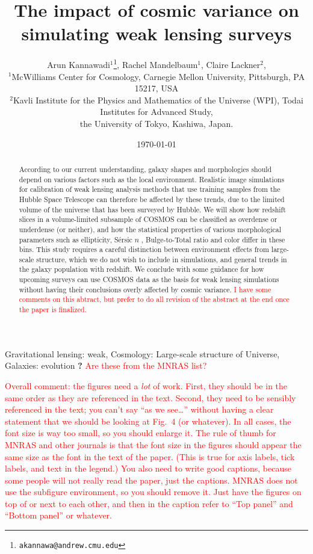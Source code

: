 \documentclass[twocolumn,useAMS,usenatbib]{mn2e}
\title[WL simulation]{The impact of cosmic variance on simulating weak lensing surveys}
\author[Kannawadi et al.]
{Arun Kannawadi$^1$\thanks{\tt akannawa@andrew.cmu.edu}, 
Rachel Mandelbaum$^1$,
Claire Lackner$^2$, 
\\$^1$McWilliams Center for Cosmology, Carnegie Mellon University, Pittsburgh, PA 15217, USA
\\$^2$Kavli Institute for the Physics and Mathematics of the Universe (WPI), Todai Institutes for Advanced Study,\\ the University of Tokyo, Kashiwa, Japan.
}
\date{\today}
\newcommand{\rachel}[1]{{\textcolor{red}{#1}}}
\newcommand{\sersicn}{S\'{e}rsic $n$ }
\newcommand{\btt}{Bulge-to-Total }
\begin{document}

\maketitle

\begin{abstract}
According to our current understanding, galaxy shapes and morphologies should depend on various factors such as the local environment. Realistic image simulations for calibration of weak lensing analysis methods that use training samples from the Hubble Space Telescope can therefore be affected by these trends, due to the limited volume of the universe that has been surveyed by Hubble. We will show how redshift slices in a volume-limited subsample of COSMOS can be classified as overdense or underdense (or neither), and how the statistical properties of various morphological parameters such as ellipticity, \sersicn, \btt ratio and color differ in these bins. This study requires a careful distinction between environment effects from large-scale structure, which we do not wish to include in simulations, and general trends in the galaxy population with redshift. We conclude with some guidance for how upcoming surveys can use COSMOS data as the basis for weak lensing simulations without having their conclusions overly affected by cosmic variance.  
\rachel{I have some comments on this abtract, but prefer to do all
  revision of the abstract at the end once the paper is finalized.}
\end{abstract}

\begin{keywords}
 Gravitational lensing: weak, Cosmology: Large-scale structure of Universe, Galaxies: evolution {\bf ?} \rachel{Are these from the MNRAS list?}
\end{keywords}

\rachel{Overall comment: the figures need a {\em lot} of work.  First,
  they should be in the same order as they are referenced in the
  text.  Second, they need to be sensibly referenced in the text; you
  can't say ``as we see\dots'' without having a clear statement that
  we should be looking at Fig.~4 (or whatever).  In all
  cases, the font size is way too small, so you should enlarge it.
  The rule of thumb for MNRAS and other journals is that the font size
  in the figures should appear the same size as the font in the text
  of the paper.  (This is true for axis labels, tick labels, and text
  in the legend.)  You also need to write good captions, because some
  people will not really read the paper, just the captions.  MNRAS
  does not use the subfigure environment, so you should remove it.
  Just have the figures on top of or next to each other, and then in
  the caption refer to ``Top panel'' and ``Bottom panel'' or whatever.}
\end{document}
